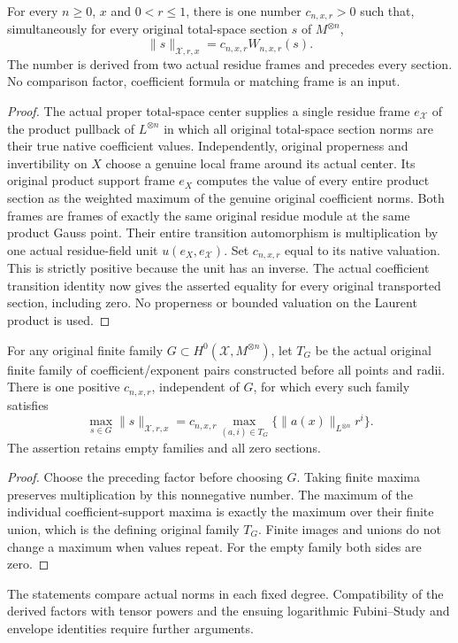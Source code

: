 \begin{theorem}\label{thm:native-tc-weighted-laurent-true-section-norms}
\leanok
For every $n\geq0$, $x$ and $0<r\leq1$, there is one number
$c_{n,x,r}>0$ such that, simultaneously for every original total-space
section $s$ of $M^{\otimes n}$,
\[
 \lVert s\rVert_{\mathcal X,r,x}=c_{n,x,r}W_{n,x,r}(s).
\]
The number is derived from two actual residue frames and precedes
every section. No comparison factor, coefficient formula or matching
frame is an input.
\end{theorem}
\begin{proof}
The actual proper total-space center supplies a single residue frame
$e_{\mathcal X}$ of the product pullback of $L^{\otimes n}$ in which
all original total-space section norms are their true native coefficient
values. Independently, original properness and invertibility on $X$
choose a genuine local frame around its actual center. Its original
product support frame $e_X$ computes the value of every entire product
section as the weighted maximum of the genuine original coefficient
norms. Both frames are frames of exactly the same original residue
module at the same product Gauss point. Their entire transition
automorphism is multiplication by one actual residue-field unit
$u(e_X,e_{\mathcal X})$. Set $c_{n,x,r}$ equal to its native valuation.
This is strictly positive because the unit has an inverse. The actual
coefficient transition identity now gives the asserted equality for
every original transported section, including zero. No properness or
bounded valuation on the Laurent product is used.
\end{proof}

\begin{corollary}\label{cor:native-tc-weighted-laurent-finite-section-norms}
\leanok
For any original finite family $G\subset H^0(\mathcal X,M^{\otimes n})$,
let $T_G$ be the actual original finite family of coefficient/exponent
pairs constructed before all points and radii. There is one positive
$c_{n,x,r}$, independent of $G$, for which every such family satisfies
\[
 \max_{s\in G}\lVert s\rVert_{\mathcal X,r,x}
 =c_{n,x,r}\max_{(a,i)\in T_G}\{\lVert a(x)\rVert_{L^{\otimes n}}r^i\}.
\]
The assertion retains empty families and all zero sections.
\end{corollary}
\begin{proof}
Choose the preceding factor before choosing $G$. Taking finite maxima
preserves multiplication by this nonnegative number. The maximum of
the individual coefficient-support maxima is exactly the maximum over
their finite union, which is the defining original family $T_G$.
Finite images and unions do not change a maximum when values repeat.
For the empty family both sides are zero.
\end{proof}

\begin{remark}
The statements compare actual norms in each fixed degree. Compatibility
of the derived factors with tensor powers and the ensuing logarithmic
Fubini--Study and envelope identities require further arguments.
\end{remark}
